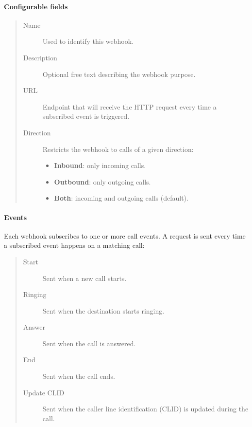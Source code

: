 \documentclass[letterpaper,10pt,english]{sphinxmanual}
\begin{document}
\paragraph{Configurable fields}
\label{administration_portal/client/vpbx/calls/webhooks:configurable-fields}\begin{quote}
\begin{description}
\item[{Name}] \leavevmode
Used to identify this webhook.

\item[{Description}] \leavevmode
Optional free text describing the webhook purpose.

\item[{URL}] \leavevmode
Endpoint that will receive the HTTP  request every time a subscribed event is triggered.

\item[{Direction}] \leavevmode
Restricts the webhook to calls of a given direction:
\begin{itemize}
\item {} 
\textbf{Inbound}: only incoming calls.

\item {} 
\textbf{Outbound}: only outgoing calls.

\item {} 
\textbf{Both}: incoming and outgoing calls (default).

\end{itemize}

\end{description}
\end{quote}


\paragraph{Events}
\label{administration_portal/client/vpbx/calls/webhooks:events}
Each webhook subscribes to one or more call events. A  request is sent every time a subscribed
event happens on a matching call:
\begin{quote}
\begin{description}
\item[{Start}] \leavevmode
Sent when a new call starts.

\item[{Ringing}] \leavevmode
Sent when the destination starts ringing.

\item[{Answer}] \leavevmode
Sent when the call is answered.

\item[{End}] \leavevmode
Sent when the call ends.

\item[{Update CLID}] \leavevmode
Sent when the caller line identification (CLID) is updated during the call.

\end{description}
\end{quote}
\end{document}
